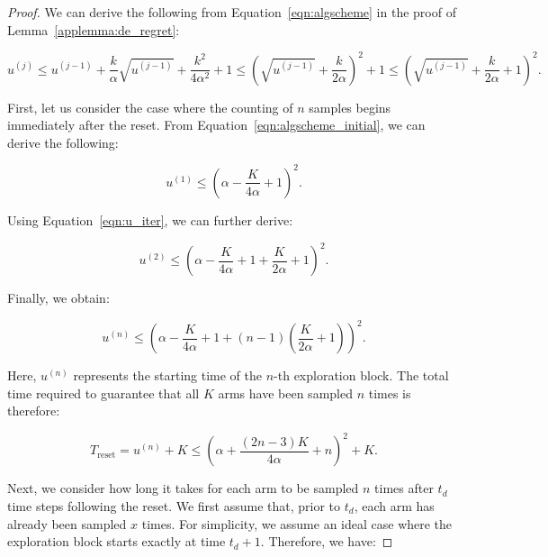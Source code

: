 \documentclass[twoside]{article}
\theoremstyle{plain}
\theoremstyle{definition}
\theoremstyle{remark}
\begin{document}
\begin{proof}

    We can derive the following from Equation~\ref{eqn:algscheme} in the proof of Lemma~\ref{applemma:de_regret}:
    
    \begin{equation}\label{eqn:u_iter}
    u^{(j)} \leq u^{(j-1)} + \frac{k}{\alpha} \sqrt{u^{(j-1)}} + \frac{k^2}{4\alpha^2} + 1 
    \leq \left( \sqrt{u^{(j-1)}} + \frac{k}{2\alpha} \right)^2 + 1 
    \leq \left( \sqrt{u^{(j-1)}} + \frac{k}{2\alpha} + 1 \right)^2.
    \end{equation}
    
    First, let us consider the case where the counting of \(n\) samples begins immediately after the reset. From Equation~\ref{eqn:algscheme_initial}, we can derive the following:
    
    \begin{equation}
    u^{(1)} \leq \left( \alpha - \frac{K}{4\alpha} + 1 \right)^2.
    \end{equation}
    
    Using Equation~\ref{eqn:u_iter}, we can further derive:
    
    \begin{equation}
    u^{(2)} \leq \left( \alpha - \frac{K}{4\alpha} + 1 + \frac{K}{2\alpha} + 1 \right)^2.
    \end{equation}
    
    Finally, we obtain:
    
    \begin{equation}
    u^{(n)} \leq \left( \alpha - \frac{K}{4\alpha} + 1 + (n-1)\left( \frac{K}{2\alpha} + 1 \right) \right)^2.
    \end{equation}
    
    Here, \(u^{(n)}\) represents the starting time of the \(n\)-th exploration block. The total time required to guarantee that all \(K\) arms have been sampled \(n\) times is therefore:
    
    \begin{equation}
    T_{\text{reset}} = u^{(n)} + K \leq \left( \alpha + \frac{(2n-3)K}{4\alpha} + n \right)^2 + K.
    \end{equation}
    
    Next, we consider how long it takes for each arm to be sampled \(n\) times after \(t_d\) time steps following the reset. We first assume that, prior to \(t_d\), each arm has already been sampled \(x\) times. For simplicity, we assume an ideal case where the exploration block starts exactly at time \(t_d + 1\). Therefore, we have:
    

\end{proof}
\end{document}
